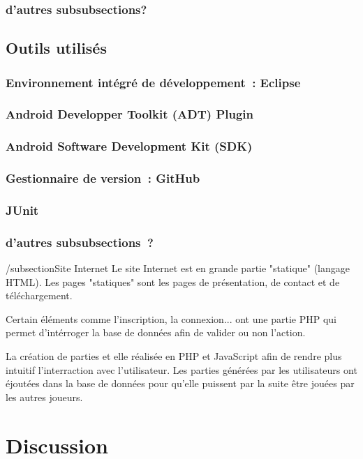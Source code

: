 \documentclass[a4paper,11pt,french]{article}
\begin{document}
\subsubsection{d'autres subsubsections?}

\subsection{Outils utilisés}
\subsubsection{Environnement intégré de développement~: Eclipse}
\subsubsection{Android Developper Toolkit (ADT) Plugin}
\subsubsection{Android Software Development Kit (SDK)}
\subsubsection{Gestionnaire de version~: GitHub}
\subsubsection{JUnit}
\subsubsection{d'autres subsubsections~?}


/subsection{Site Internet}
Le site Internet est en grande partie "statique" (langage HTML). Les pages "statiques" sont les pages de présentation, de contact et de téléchargement.

Certain éléments comme l'inscription, la connexion... ont une partie PHP qui permet d'intérroger la base de données afin de valider ou non l'action.

La création de parties et elle réalisée en PHP et JavaScript afin de rendre plus intuitif l'interraction avec l'utilisateur. Les parties générées par les utilisateurs ont éjoutées dans la base de données pour qu'elle puissent par la suite être jouées par les autres joueurs.


\section{Discussion}
\end{document}
